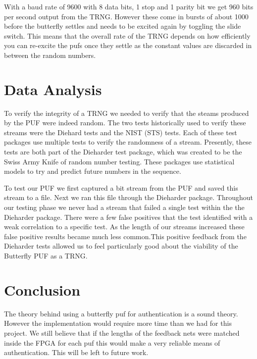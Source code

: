 		With a baud rate of 9600 with 8 data bits, 1 stop and 1 parity bit we get 960 bits per second output from the TRNG.  However these come in bursts of about 1000 before the butterfly settles and needs to be excited again by toggling the slide switch.  This means that the overall rate of the TRNG depends on how efficiently you can re-excite the pufs once they settle as the constant values are discarded in between the random numbers.
		
	
	

\section{Data Analysis}\label{sec::analysis} 
	To verify the integrity of a TRNG we needed to verify that the steams produced by the PUF were indeed random. The two tests historically used to verify these streams were the Diehard tests and the NIST (STS) tests. Each of these test packages use multiple tests to verify the randomness of a stream. Presently, these tests are both part of the Dieharder test package, which was created to be the Swiss Army Knife of random number testing. These packages use statistical models to try and predict future numbers in the sequence.

	To test our PUF we first captured a bit stream from the PUF and saved this stream to a file. Next we ran this file through the Dieharder package. Throughout our testing phase we never had a stream that failed a single test within the the Dieharder package. There were a few false positives that the test identified with a weak correlation to a specific test. As the length of our streams increased these false positive results became much less common.This positive feedback from the Dieharder tests allowed us to feel particularly good about the viability of the Butterfly PUF as a TRNG.

\section{Conclusion}\label{sec::conclusion} 
		The theory behind using a butterfly puf for authentication is a sound theory.  However the implementation would require more time than we had for this project.  We still believe that if the lengths of the feedback nets were matched inside the FPGA for each puf this would make a very reliable means of authentication.  This will be left to future work.
		
